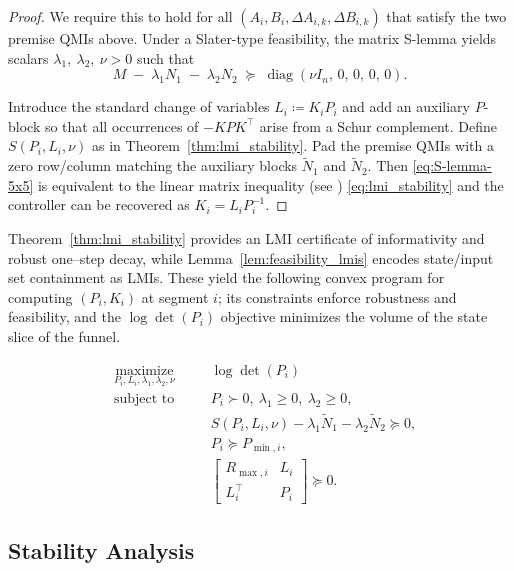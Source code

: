 \documentclass[letterpaper, 10 pt, conference]{ieeeconf}
\DeclareMathOperator{\diag}{diag}
\begin{document}
\begin{proof}
We require this to hold for all $(A_{i},B_{i},\Delta A_{i,k},\Delta B_{i,k})$ that satisfy the two premise QMIs above.
Under a Slater-type feasibility, the matrix S-lemma yields scalars
$\lambda_1,\ \lambda_2,\ \nu>0$ such that
\begin{equation}\label{eq:S-lemma-5x5}
M\;-\;\lambda_1 N_1\;-\;\lambda_2 N_2\;\succeq\;\diag(\nu I_n,\,0,\,0,\,0,\,0).
\end{equation}

Introduce the standard change of variables $L_i\coloneqq K_iP_i$ and add an auxiliary $P$-block so that all occurrences of $-KPK^\top$ arise from a Schur complement. Define $S(P_i, L_i,\nu)$ as in Theorem~\ref{thm:lmi_stability}.
Pad the premise QMIs with a zero row/column matching the auxiliary blocks $\widetilde N_1$ and $\widetilde N_2$.
Then \eqref{eq:S-lemma-5x5} is equivalent to the linear matrix inequality (see \cite{vanWaarde2020MatrixSLemma}) \eqref{eq:lmi_stability} and the controller can be recovered as $K_i=L_i P_i^{-1}$.
\end{proof}


Theorem~\ref{thm:lmi_stability} provides an LMI certificate of informativity and robust one–step decay, while Lemma~\ref{lem:feasibility_lmis} encodes state/input set containment as LMIs. These yield the following convex program for computing $(P_i,K_i)$ at segment $i$; its constraints enforce robustness and feasibility, and the $\log\det(P_i)$ objective minimizes the volume of the state slice of the funnel.

\begin{equation}\label{eq:main_sdp}
\begin{aligned}
& \underset{P_i, L_i, \lambda_1, \lambda_2,\nu}{\text{maximize}} && \log\det(P_i) \\
& \text{subject to} \quad && P_i \succ 0,\ \lambda_1 \ge 0,\ \lambda_2 \ge 0, \\
&&& S(P_i,L_i,\nu) - \lambda_1 \widetilde N_1 - \lambda_2 \widetilde N_2 \succeq 0, \\
&&& P_i \succeq P_{\min,i}, \\
&&& \begin{bmatrix} R_{\max,i} & L_i \\ L_i^\top & P_i \end{bmatrix} \succeq 0 . 
\end{aligned}
\end{equation}


\subsection{Stability Analysis}
\label{subsec:stability_analysis}
\end{document}
